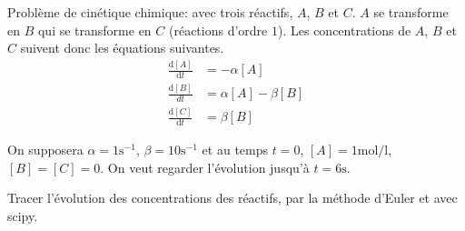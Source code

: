 \begin{exo}
   Problème de cinétique chimique: avec trois réactifs, $A$, $B$ et
$C$. $A$ se transforme en $B$ qui se transforme en $C$ (réactions d'ordre $1$). 
Les concentrations de $A$, $B$ et $C$ suivent donc les équations suivantes.
\begin{align*}
  \frac{\mathrm{d}[A]}{\mathrm{d}t}&=-\alpha[A]\\
\frac{\mathrm{d}[B]}{dt}&=\alpha[A]-\beta[B]\\
\frac{\mathrm{d}[C]}{\mathrm{d}t}&=\beta[B]
\end{align*}

On supposera $\alpha=1\text{s}^{-1}$, $\beta=10\text{s}^{-1}$ et au
temps $t=0$, $[A] = 1\text{mol}/\text{l}$, $[B]=[C]=0$. On veut
regarder l'évolution
jusqu'à $t=6\text{s}$.

Tracer l'évolution des concentrations des réactifs, par la méthode d'Euler et avec scipy.
\end{exo} 

